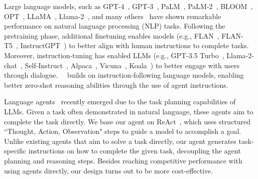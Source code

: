 Large language models, such as GPT-4~\citep{openai2023gpt4}, GPT-3~\citep{brown2020language}, PaLM~\citep{chowdhery2022palm}, PaLM-2~\citep{anil2023palm}, BLOOM~\citep{workshop2023bloom}, OPT~\citep{zhang2022opt}, LLaMA~\citep{touvron2023llama}, Llama-2~\citep{touvron2023llama2}, and many others~\citep{radford2019language, gpt-j, gpt-neo, smith2022using, hoffmann2022training, penedo2023refinedweb} have shown remarkable performance on natural language processing (NLP) tasks. Following the pretraining phase, additional finetuning enables models (e.g., FLAN~\citep{wei2022finetuned}, FLAN-T5~\citep{chung2022scaling}, InstructGPT~\citep{ouyang2022training}) to better align with human instructions to complete tasks. Moreover, instruction-tuning has enabled LLMs (e.g., GPT-3.5 Turbo~\citep{openaichatgpt}, Llama-2-chat~\citep{touvron2023llama2}, Self-Instruct~\citep{wang2023selfinstruct}, Alpaca~\citep{alpaca2023}, Vicuna~\citep{vicuna2023}, Koala~\citep{koala2023}) to better engage with users through dialogue. \zeroshotstart\ \method\ builds on instruction-following language models, enabling better zero-shot reasoning abilities through the use of agent instructions.

Language agents~\citep{yao2023react, shinn2023reflexion, xu2023expertprompting, park2023generative, zhou2023agents, andreas-2022-language, wang2023survey, xi2023rise, sumers2023cognitive, chan2023chateval} recently emerged due to the task planning capabilities of LLMs. Given a task often demonstrated in natural language, these agents aim to complete the task directly. 
We base our agent on ReAct~\citep{yao2023react}, which uses structured ``Thought, Action, Observation" steps to guide a model to accomplish a goal.
Unlike existing agents that aim to solve a task directly, our agent generates task-specific instructions on how to complete the given task, decoupling the agent planning and reasoning steps. Besides reaching competitive performance with using agents directly, our design turns out to be more cost-effective.

